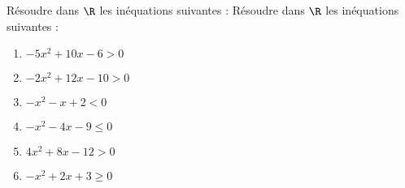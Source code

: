 \documentclass[a4paper,11pt,exos]{nsi} %
\begin{document}
\maketitle

Résoudre dans $\R$ les inéquations suivantes :
Résoudre dans $\R$ les inéquations suivantes :
\begin{multicols}{2}
    \begin{enumerate}[itemsep=1em]
        \item $-5x^2+10x-6> 0$
	    \item $-2x^2+12x-10>0$
	    \item $-x^2-x+2< 0$
	    \item $-x^2-4x-9\leqslant 0$
	    \item $4x^2+8x-12>0$
	    \item $-x^2+2x+3\geqslant 0$
    \end{enumerate}
\end{multicols}
\end{document}
